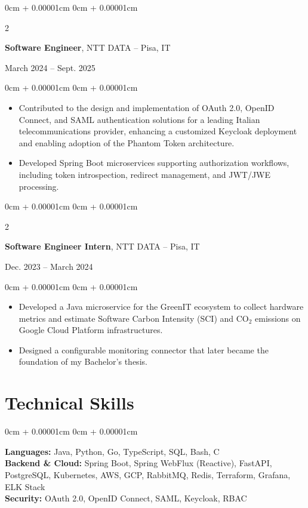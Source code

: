 \documentclass[10pt, letterpaper]{article}
\newenvironment{highlights}{
    \begin{itemize}[
        topsep=0.04cm,
        parsep=0pt,
        partopsep=0pt,
        itemsep=0pt,
        leftmargin=10pt
    ]
}{
    \end{itemize}
}
\newenvironment{onecolentry}{
    \begin{adjustwidth}{
        0cm + 0.00001cm
    }{
        0cm + 0.00001cm
    }
}{
    \end{adjustwidth}
}
\newenvironment{twocolentry}[2][]{
    \onecolentry
    \def\secondColumn{#2}
    \setcolumnwidth{\fill, 4.5cm}
    \begin{paracol}{2}
}{
    \switchcolumn
    \raggedleft
    \secondColumn
    \end{paracol}
    \endonecolentry
}
\begin{document}
\begin{twocolentry}{
        March 2024 -- Sept. 2025
    }
    \textbf{Software Engineer}, NTT DATA -- Pisa, IT
\end{twocolentry}

\begin{onecolentry}
    \begin{highlights}
        \item Contributed to the design and implementation of OAuth 2.0, OpenID Connect, and SAML authentication solutions for a leading Italian telecommunications provider, enhancing a customized Keycloak deployment and enabling adoption of the Phantom Token architecture.

        \item Developed Spring Boot microservices supporting authorization workflows, including token introspection, redirect management, and JWT/JWE processing.
    \end{highlights}
\end{onecolentry}

\begin{twocolentry}{
        Dec. 2023 -- March 2024
    }
    \textbf{Software Engineer Intern}, NTT DATA -- Pisa, IT
\end{twocolentry}

\begin{onecolentry}
    \begin{highlights}
        \item Developed a Java microservice for the GreenIT ecosystem to collect hardware metrics and estimate Software Carbon Intensity (SCI) and CO$_2$ emissions on Google Cloud Platform infrastructures.

        \item Designed a configurable monitoring connector that later became the foundation of my Bachelor's thesis.
    \end{highlights}
\end{onecolentry}

\section{Technical Skills}

\begin{onecolentry}
    \textbf{Languages:} Java, Python, Go, TypeScript, SQL, Bash, C \\
    \textbf{Backend \& Cloud:} Spring Boot, Spring WebFlux (Reactive), FastAPI, PostgreSQL, Kubernetes, AWS, GCP, RabbitMQ, Redis, Terraform, Grafana, ELK Stack \\
    \textbf{Security:} OAuth 2.0, OpenID Connect, SAML, Keycloak, RBAC
\end{onecolentry}
\end{document}

